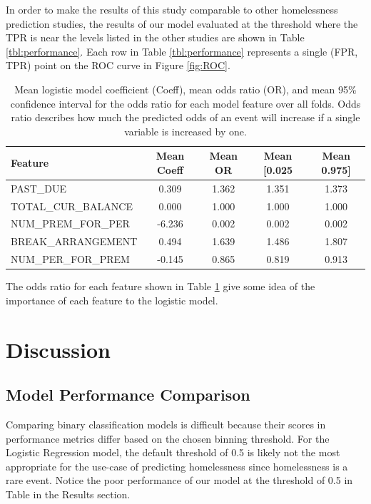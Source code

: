 \documentclass[10pt,letterpaper]{article}
\newcommand{\red}[1]{{\color{red}{#1}}}
\begin{document}
In order to make the results of this study comparable to other homelessness prediction studies, the results of our model evaluated at the threshold where the TPR is near the levels listed in the other studies are shown in Table \ref{tbl:performance}. Each row in Table \ref{tbl:performance} represents a single (FPR, TPR) point on the ROC curve in Figure \ref{fig:ROC}. 

\begin{table}[!h]
    \begin{tabular}{lcccc}
    \toprule
              Feature &  Mean Coeff &  Mean OR &  Mean [0.025 &  Mean 0.975] \\
    \midrule
    PAST\_DUE &       0.309 &    1.362 &        1.351 &        1.373 \\
    TOTAL\_CUR\_BALANCE &       0.000 &    1.000 &        1.000 &        1.000 \\
     NUM\_PREM\_FOR\_PER &      -6.236 &    0.002 &        0.002 &        0.002 \\
    BREAK\_ARRANGEMENT &       0.494 &    1.639 &        1.486 &        1.807 \\
     NUM\_PER\_FOR\_PREM &      -0.145 &    0.865 &        0.819 &        0.913 \\
    \bottomrule
    \end{tabular}
    \label{tbl:meanParams}
    \caption{Mean logistic model coefficient (Coeff), mean odds ratio (OR), and mean 95\% confidence interval for the odds ratio for each model feature over all folds. Odds ratio describes how much the predicted odds of an event will increase if a single variable is increased by one.}
\end{table}

The odds ratio for each feature shown in Table \ref{tbl:meanParams} give some idea of the importance of each feature to the logistic model. 

\section*{Discussion}
\subsection*{Model Performance Comparison}
Comparing binary classification models is difficult because their scores in performance metrics differ based on the chosen binning threshold. For the Logistic Regression model, the default threshold of 0.5 is likely not the most appropriate for the use-case of predicting homelessness since homelessness is a rare event. Notice the poor performance of our model at the threshold of 0.5 in Table \red{ADD TABLE REFERENCE} in the Results section. 
\end{document}
